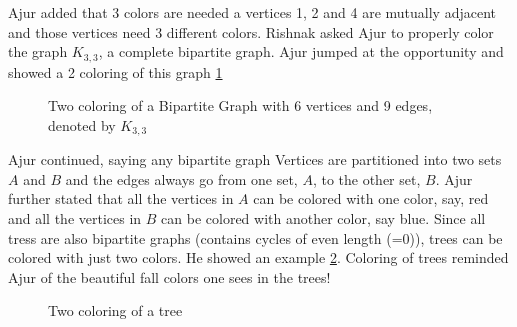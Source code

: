 Ajur added that 3 colors are needed a vertices 1, 2 and 4 are mutually adjacent and those vertices need 3 different colors. 
Rishnak asked Ajur to properly color the graph $K_{3,3}$, a complete bipartite graph. Ajur jumped at the opportunity and showed a 2 coloring of this graph \ref{10g3}
\begin{figure}
\begin{center}
\caption{ Two coloring of a Bipartite Graph with 6 vertices and 9 edges, denoted by $K_{3,3}$}\label{10g3}
\end{center}
\end{figure}

Ajur continued, saying any bipartite graph Vertices are partitioned into two sets $A$ and $B$ and the edges always go from one set, $A$, to the other set, $B$. Ajur further stated that all the vertices in $A$ can be colored with one color, say, red and all the vertices in $B$ can be colored with another color, say blue. Since all tress are also bipartite graphs (contains cycles of even length (=0)), trees can be colored with just two colors. He showed an example \ref{10g4}. Coloring of trees reminded Ajur of the beautiful fall colors one sees in the trees!
\begin{figure}
\begin{center}


\caption{Two coloring of a tree }\label{10g4}
\end{center}
\end{figure}

